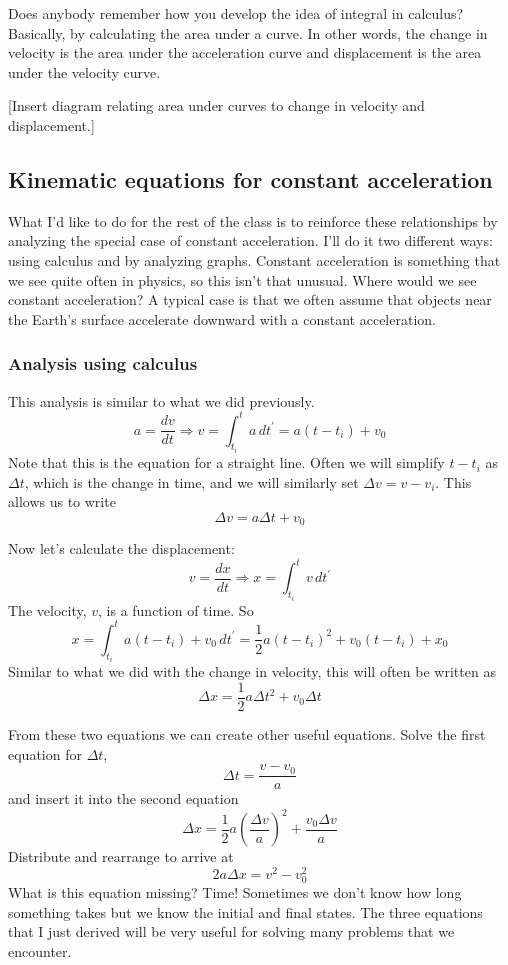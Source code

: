 Does anybody remember how you develop the idea of integral in calculus? Basically, by calculating the area under a curve. In other words, the change in velocity is the area under the acceleration curve and displacement is the area under the velocity curve.

[Insert diagram relating area under curves to change in velocity and displacement.]
\vspace{5cm}

\subsection{Kinematic equations for constant acceleration}
What I'd like to do for the rest of the class is to reinforce these relationships by analyzing the special case of constant acceleration. I'll do it two different ways: using calculus and by analyzing graphs. Constant acceleration is something that we see quite often in physics, so this isn't that unusual. Where would we see constant acceleration? A typical case is that we often assume that objects near the Earth's surface accelerate downward with a constant acceleration.

\subsubsection{Analysis using calculus}
This analysis is similar to what we did previously.
$$a=\frac{dv}{dt}\Rightarrow v=\int_{t_i}^t a\,dt^\prime = a(t-t_i) + v_0$$
Note that this is the equation for a straight line. Often we will simplify $t-t_i$ as $\Delta{t}$, which is the change in time, and we will similarly set $\Delta{v}=v-v_i$. This allows us to write
$$\boxed{\Delta{v}=a\Delta{t}+v_0}$$

Now let's calculate the displacement:
$$v=\frac{dx}{dt}\Rightarrow x=\int_{t_i}^t v\,dt^\prime$$
The velocity, $v$, is a function of time. So
$$x=\int_{t_i}^t a(t-t_i)+v_0\,dt^\prime=\frac{1}{2}a(t-t_i)^2+v_0(t-t_i)+x_0$$
Similar to what we did with the change in velocity, this will often be written as
$$\boxed{\Delta{x}=\frac{1}{2}a\Delta{t}^2+v_0\Delta{t}}$$

From these two equations we can create other useful equations. Solve the first equation for $\Delta{t}$,
$$\Delta{t}=\frac{v-v_0}{a}$$
and insert it into the second equation
$$\Delta{x}=\frac{1}{2}a\left(\frac{\Delta{v}}{a}\right)^2 + \frac{v_0\Delta{v}}{a}$$
Distribute and rearrange to arrive at
$$\boxed{2a\Delta{x}=v^2-v_0^2}$$
What is this equation missing? Time! Sometimes we don't know how long something takes but we know the initial and final states. The three equations that I just derived will be very useful for solving many problems that we encounter.

